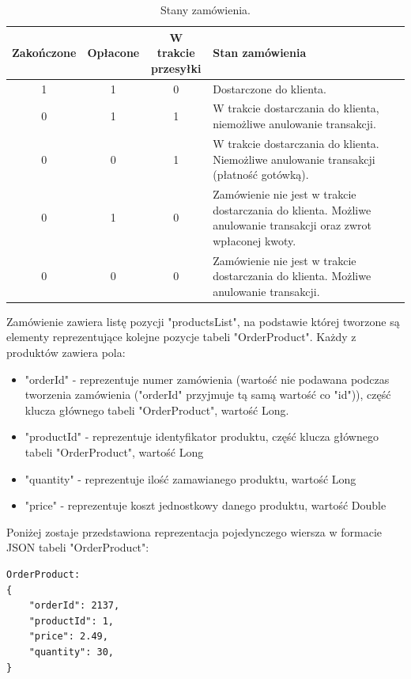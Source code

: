 \documentclass[11pt,a4paper,twoside]{article}
\begin{document}
\begin{table}[htp]
\caption{Stany zamówienia.}
\label{stanyZamowienia}
\centering
\begin{tabularx}{\textwidth}{|c|c|c|X|}
\hline
 Zakończone & Opłacone & \makecell{W trakcie \\ przesyłki} & Stan zamówienia \\\hline
 1 & 1 & 0 & Dostarczone do klienta. \\\hline
 0 & 1 & 1 & W trakcie dostarczania do klienta, niemożliwe anulowanie transakcji. \\\hline
 0 & 0 & 1 & W trakcie dostarczania do klienta. Niemożliwe anulowanie transakcji (płatność gotówką). \\\hline
 0 & 1 & 0 & Zamówienie nie jest w trakcie dostarczania do klienta. Możliwe anulowanie transakcji oraz zwrot wpłaconej kwoty. \\\hline
 0 & 0 & 0 & Zamówienie nie jest w trakcie dostarczania do klienta. Możliwe anulowanie transakcji. \\\hline
\end{tabularx}
\end{table}

Zamówienie zawiera listę  pozycji  "productsList", na podstawie której tworzone są elementy reprezentujące kolejne pozycje tabeli "OrderProduct". Każdy z produktów zawiera pola:
\begin{itemize}
\item "orderId" - reprezentuje numer zamówienia (wartość nie podawana podczas tworzenia zamówienia ("orderId" przyjmuje tą samą wartość co "id")), część klucza głównego tabeli "OrderProduct", wartość Long.
\item "productId" - reprezentuje identyfikator produktu, część klucza głównego tabeli "OrderProduct", wartość Long
\item "quantity" - reprezentuje ilość zamawianego produktu, wartość Long 
\item "price" - reprezentuje koszt jednostkowy danego produktu, wartość Double
\end{itemize}

Poniżej zostaje przedstawiona reprezentacja pojedynczego wiersza w formacie JSON tabeli "OrderProduct":

\begin{lstlisting}
OrderProduct:
{
	"orderId": 2137,
    "productId": 1,
    "price": 2.49,
    "quantity": 30,
}
\end{lstlisting}
\vspace{-20pt}
\end{document}
